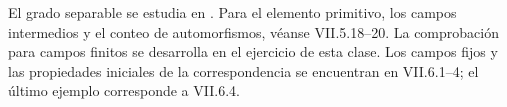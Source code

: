 \begin{obs}
El grado separable se estudia en \citet[cap.~VII, lemas 4.22--23 y proposición 4.24]{aluffi2009}. Para el elemento primitivo, los campos intermedios y el conteo de automorfismos, véanse VII.5.18--20. La comprobación para campos finitos se desarrolla en el ejercicio de esta clase. Los campos fijos y las propiedades iniciales de la correspondencia se encuentran en VII.6.1--4; el último ejemplo corresponde a VII.6.4.
\end{obs}
